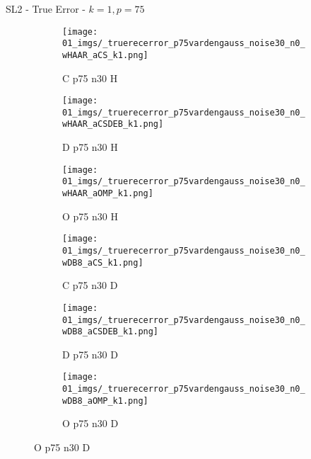 \begin{frame}{SL2 - True Error - $k=1,p=75$}{}
\begin{figure}
\vspace{5pt}

\begin{subfigure}{0.13\textwidth}
\texttt{[image: 01\_imgs/\_truerecerror\_p75vardengauss\_noise30\_n0\_wHAAR\_aCS\_k1.png]}
\caption*{\tiny C p75 n30 H}
\end{subfigure}
\begin{subfigure}{0.13\textwidth}
\texttt{[image: 01\_imgs/\_truerecerror\_p75vardengauss\_noise30\_n0\_wHAAR\_aCSDEB\_k1.png]}
\caption*{\tiny D p75 n30 H}
\end{subfigure}
\begin{subfigure}{0.13\textwidth}
\texttt{[image: 01\_imgs/\_truerecerror\_p75vardengauss\_noise30\_n0\_wHAAR\_aOMP\_k1.png]}
\caption*{\tiny O p75 n30 H}
\end{subfigure}
\begin{subfigure}{0.13\textwidth}
\texttt{[image: 01\_imgs/\_truerecerror\_p75vardengauss\_noise30\_n0\_wDB8\_aCS\_k1.png]}
\caption*{\tiny C p75 n30 D}
\end{subfigure}
\begin{subfigure}{0.13\textwidth}
\texttt{[image: 01\_imgs/\_truerecerror\_p75vardengauss\_noise30\_n0\_wDB8\_aCSDEB\_k1.png]}
\caption*{\tiny D p75 n30 D}
\end{subfigure}
\begin{subfigure}{0.13\textwidth}
\texttt{[image: 01\_imgs/\_truerecerror\_p75vardengauss\_noise30\_n0\_wDB8\_aOMP\_k1.png]}
\caption*{\tiny O p75 n30 D}
\end{subfigure}
\end{figure}
\end{frame}


